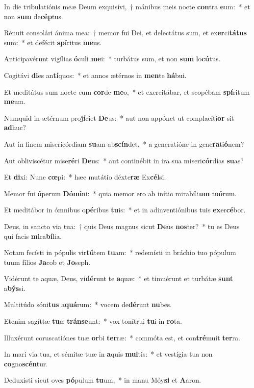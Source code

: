 \item In die tribulatiónis meæ Deum exquisívi,~† mánibus meis nocte \textbf{con}tra \textbf{e}um:~* et non \textbf{sum} de\textbf{cép}tus.
\item Rénuit consolári ánima mea:~† memor fui Dei, et delectátus sum, et ex\textbf{er}ci\textbf{tá}\textbf{tus} sum:~* et defécit \textbf{spí}ritus \textbf{me}us.
\item Anticipavérunt vigílias \textbf{ó}culi \textbf{me}i:~* turbátus sum, et non \textbf{sum} lo\textbf{cú}tus.
\item Cogitávi \textbf{di}es an\textbf{tí}quos:~* et annos ætérnos in \textbf{men}te \textbf{há}bui.
\item Et meditátus sum nocte cum \textbf{cor}de \textbf{me}o,~* et exercitábar, et scopébam \textbf{spí}ritum \textbf{me}um.
\item Numquid in ætérnum pro\textbf{jí}ciet \textbf{De}us:~* aut non appónet ut complacíti\textbf{or} sit \textbf{ad}huc?
\item Aut in finem misericórdiam \textbf{su}am ab\textbf{scín}det,~* a generatióne in gene\textbf{ra}ti\textbf{ó}nem?
\item Aut obliviscétur mise\textbf{ré}ri \textbf{De}us:~* aut continébit in ira sua miseri\textbf{cór}dias \textbf{su}as?
\item Et \textbf{di}xi: Nunc \textbf{cœ}pi:~* hæc mutátio déxte\textbf{ræ} Ex\textbf{cél}si.
\item Memor fui \textbf{ó}perum \textbf{Dó}\textbf{mi}ni:~* quia memor ero ab inítio mirabíli\textbf{um} tu\textbf{ó}rum.
\item Et meditábor in ómnibus o\textbf{pé}ribus \textbf{tu}is:~* et in adinventiónibus tuis \textbf{ex}er\textbf{cé}bor.
\item Deus, in sancto via tua:~† quis Deus magnus sicut \textbf{De}us \textbf{nos}ter?~* tu es Deus qui facis \textbf{mi}ra\textbf{bí}lia.
\item Notam fecísti in pópulis vir\textbf{tú}tem \textbf{tu}am:~* redemísti in bráchio tuo pópulum tuum fílios \textbf{Ja}cob et \textbf{Jo}seph.
\item Vidérunt te aquæ, Deus, vi\textbf{dé}runt te \textbf{a}quæ:~* et timuérunt et turbátæ \textbf{sunt} a\textbf{býs}si.
\item Multitúdo sóni\textbf{tus} a\textbf{quá}rum:~* vocem de\textbf{dé}runt \textbf{nu}bes.
\item Etenim sagíttæ \textbf{tu}æ \textbf{tráns}\textbf{e}unt:~* vox tonítrui \textbf{tu}i in \textbf{ro}ta.
\item Illuxérunt coruscatiónes tuæ \textbf{or}bi \textbf{ter}ræ:~* commóta est, et con\textbf{tré}muit \textbf{ter}ra.
\item In mari via tua, et sémitæ tuæ in \textbf{a}quis \textbf{mul}tis:~* et vestígia tua non \textbf{co}gno\textbf{scén}tur.
\item Deduxísti sicut oves \textbf{pó}pulum \textbf{tu}um,~* in manu Móy\textbf{si} et \textbf{A}aron.
